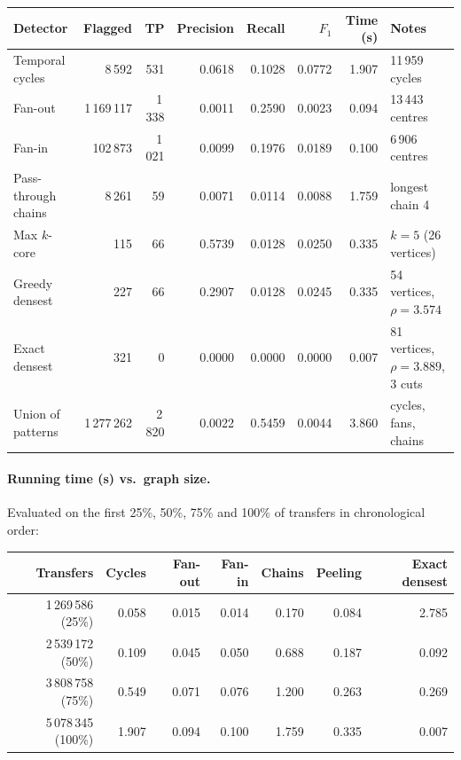\documentclass[11pt,a4paper]{article}
\theoremstyle{definition}
\begin{document}
\begin{center}
{\footnotesize
\setlength{\tabcolsep}{4pt}
\begin{tabular}{@{}lrrrrrrl@{}}
\toprule
\textbf{Detector} & \textbf{Flagged} & \textbf{TP} & \textbf{Precision} & \textbf{Recall} & \textbf{$F_1$} & \textbf{Time (s)} & \textbf{Notes} \\
\midrule
Temporal cycles & 8\,592 & 531 & 0.0618 & 0.1028 & 0.0772 & 1.907 & 11\,959 cycles \\
Fan-out & 1\,169\,117 & 1\,338 & 0.0011 & 0.2590 & 0.0023 & 0.094 & 13\,443 centres \\
Fan-in & 102\,873 & 1\,021 & 0.0099 & 0.1976 & 0.0189 & 0.100 & 6\,906 centres \\
Pass-through chains & 8\,261 & 59 & 0.0071 & 0.0114 & 0.0088 & 1.759 & longest chain 4 \\
Max $k$-core & 115 & 66 & 0.5739 & 0.0128 & 0.0250 & 0.335 & $k = 5$ (26 vertices) \\
Greedy densest & 227 & 66 & 0.2907 & 0.0128 & 0.0245 & 0.335 & 54 vertices, $\rho = 3.574$ \\
Exact densest & 321 & 0 & 0.0000 & 0.0000 & 0.0000 & 0.007 & 81 vertices, $\rho = 3.889$, 3 cuts \\
\midrule
Union of patterns & 1\,277\,262 & 2\,820 & 0.0022 & 0.5459 & 0.0044 & 3.860 & cycles, fans, chains \\
\bottomrule
\end{tabular}
}
\end{center}

\paragraph{Running time (s) vs.\ graph size.} Evaluated on the first 25\%, 50\%, 75\% and 100\% of transfers in chronological order:

\begin{center}
{\small
\setlength{\tabcolsep}{5pt}
\begin{tabular}{@{}rrrrrrr@{}}
\toprule
\textbf{Transfers} & \textbf{Cycles} & \textbf{Fan-out} & \textbf{Fan-in} & \textbf{Chains} & \textbf{Peeling} & \textbf{Exact densest} \\
\midrule
1\,269\,586 (25\%)  & 0.058 & 0.015 & 0.014 & 0.170 & 0.084 & 2.785 \\
2\,539\,172 (50\%)  & 0.109 & 0.045 & 0.050 & 0.688 & 0.187 & 0.092 \\
3\,808\,758 (75\%)  & 0.549 & 0.071 & 0.076 & 1.200 & 0.263 & 0.269 \\
5\,078\,345 (100\%) & 1.907 & 0.094 & 0.100 & 1.759 & 0.335 & 0.007 \\
\bottomrule
\end{tabular}
}
\end{center}
\end{document}
